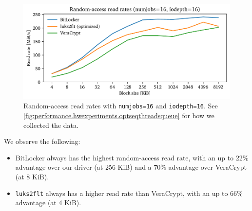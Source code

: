 \begin{figure}[htb!]
	\center
	\includegraphics[scale=1]{../fig/performance.hwexperiments.optrandthreadsqueue.pdf}
	\caption[
		Random-access read rates with \texttt{numjobs=16} and \texttt{iodepth=16}
	]{
		Random-access read rates with \texttt{numjobs=16} and \texttt{iodepth=16}. See \autoref{fig:performance.hwexperiments.optseqthreadsqueue} for how we collected the data.
	}
	\label{fig:performance.hwexperiments.optrandthreadsqueue}
\end{figure}

We observe the following:
\begin{itemize}
	\item BitLocker always has the highest random-access read rate, with an up to 22\% advantage over our driver (at 256 KiB) and a 70\% advantage over VeraCrypt (at 8 KiB).
	\item \texttt{luks2flt} always has a higher read rate than VeraCrypt, with an up to 66\% advantage (at 4 KiB).
\end{itemize}

